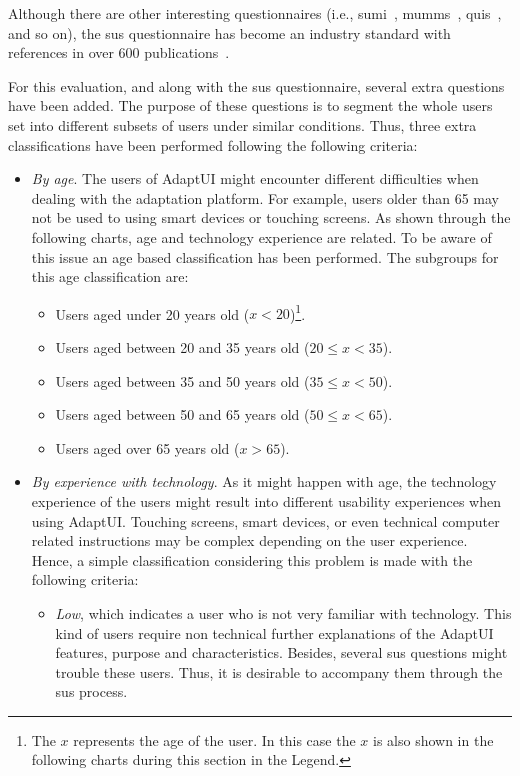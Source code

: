 Although there are other interesting questionnaires (i.e., \ac{sumi}~\citep{sumi},
\ac{mumms}~\citep{mumms}, \ac{quis}~\citep{quis}, and so on), the \ac{sus} 
questionnaire has become an industry standard with references in over 600 
publications~\citep{measuringusability}.

For this evaluation, and along with the \ac{sus} questionnaire, several extra 
questions have been added. The purpose of these questions is to segment the 
whole users set into different subsets of users under similar conditions. Thus, 
three extra classifications have been performed following the following 
criteria:

\begin{itemize}
  \item \textit{By age}. The users of AdaptUI might encounter different difficulties when
  dealing with the adaptation platform. For example, users older than 65 may not
  be used to using smart devices or touching screens. As shown through the 
  following charts, age and technology experience are related. To be aware of
  this issue an age based classification has been performed. The subgroups for
  this age classification are:
  \begin{itemize}
    \item Users aged under 20 years old ($x < 20$)\footnote{The $x$ represents
    the age of the user. In this case the $x$ is also shown in the following 
charts
    during this section in the Legend.}.
    \item Users aged between 20 and 35 years old ($20 \leq x < 35$).
    \item Users aged between 35 and 50 years old ($35 \leq x < 50$).
    \item Users aged between 50 and 65 years old ($50 \leq x < 65$).
    \item Users aged over 65 years old ($x > 65$).
  \end{itemize}

  \item \textit{By experience with technology}. As it might happen with age, the 
  technology experience of the users might result into different usability 
  experiences when using AdaptUI. Touching screens, smart devices, or even 
  technical computer related instructions may be complex depending on the user 
  experience. Hence, a simple classification considering this problem is made 
  with the following criteria:
  
  \begin{itemize}
    \item \textit{Low}, which indicates a user who is not very familiar with 
    technology. This kind of users require non technical further explanations of 
    the AdaptUI features, purpose and characteristics. Besides, several \ac{sus} 
    questions might trouble these users. Thus, it is desirable to accompany them 
    through the \ac{sus} process.
  

\end{itemize}
\end{itemize}
